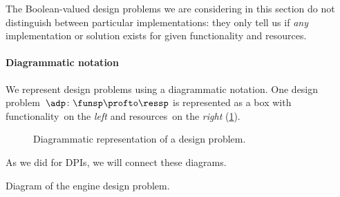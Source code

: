 The Boolean-valued design problems we are considering in this section do not distinguish between particular implementations: they only tell us if \emph{any} implementation or solution exists for given functionality and resources.

\paragraph{Diagrammatic notation}
We represent design problems using a diagrammatic notation.
One design problem~$\adp \colon \funsp \profto \ressp$ is represented as a box with functionality~\funsp on the \emph{left} and resources~\ressp on the \emph{right} (\cref{fig:diagrammaticdp}).
\begin{figure}[h!]
	\centering
	\caption{Diagrammatic representation of a design problem. }
	\label{fig:diagrammaticdp}
\end{figure}
As we did for DPIs, we will connect these diagrams.

\begin{marginfigure}
	\centering
	\caption{Diagram of the engine design problem.}
	\label{fig:enginedp}
\end{marginfigure}

